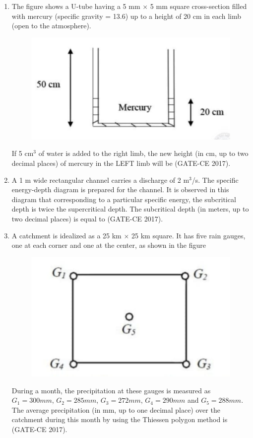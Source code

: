 \documentclass[journal,12pt,onecolumn]{article}
\theoremstyle{remark}
\begin{document}
\begin{enumerate}
    \item The figure  shows a U-tube having a 5 mm $\times$ 5 mm square cross-section filled with mercury (specific gravity = 13.6) up to a height of 20 cm in each limb (open to the atmosphere).
    \begin{figure}[H]
    \centering
    \includegraphics[width=0.7\columnwidth]{q45.jpg}  
    \caption{}
    \label{fig:13}
    \end{figure}
    If 5 cm$^3$ of water is added to the right limb, the new height (in cm, up to two decimal places) of mercury in the LEFT limb will be \underline{\hspace{3cm}} \hfill (GATE-CE 2017).

    \item A 1 m wide rectangular channel carries a discharge of 2 m$^3$/s. The specific energy-depth diagram is prepared for the channel. It is observed in this diagram that corresponding to a particular specific energy, the subcritical depth is twice the supercritical depth. The subcritical depth (in meters, up to two decimal places) is equal to \underline{\hspace{3cm}} \hfill (GATE-CE 2017).

    \item A catchment is idealized as a 25 km $\times$ 25 km square. It has five rain gauges, one at each corner and one at the center, as shown in the figure  
    \begin{figure}[H]
    \centering
    \includegraphics[width=0.7\columnwidth]{q47.jpg}  
    \caption{}
    \label{fig:14}
    \end{figure}
    During a month, the precipitation at these gauges is measured as $ G_1 = 300 mm $, $ G_2 = 285mm $, $ G_3 = 272mm $, $ G_4 = 290mm $ and $ G_5 = 288mm $. The average precipitation (in mm, up to one decimal place) over the catchment during this month by using the Thiessen polygon method is \underline{\hspace{3cm}} \hfill (GATE-CE 2017).


\end{enumerate}
\end{document}
